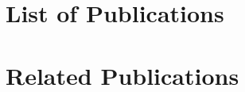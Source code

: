 \ifMonolithic\else\fi

\chapter*{List of Publications}

\chapter*{Related Publications}



\ifMonolithic\else\fi